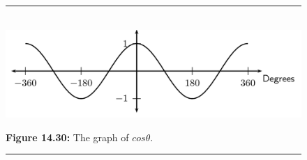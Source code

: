     \setcounter{subfigure}{0}
	\begin{figure}[H] %
    \begin{center}
    \rule[.1in]{\figurerulewidth}{.005in} \\
        \label{m39414*uid50!!!underscore!!!media}\label{m39414*uid50!!!underscore!!!printimage}\includegraphics{col11306.imgs/m39414_MG10C15_024.png} %
      \vspace{2pt}
    \vspace{\rubberspace}\par \begin{cnxcaption}
	  \small \textbf{Figure 14.30: }The graph of $cos\theta $.
	\end{cnxcaption}
    \vspace{.1in}
    \rule[.1in]{\figurerulewidth}{.005in} \\
    \end{center}
 \end{figure}       
      \label{m39414*uid51}
